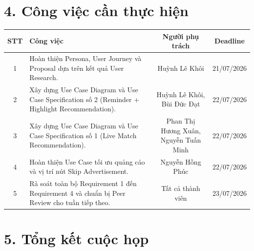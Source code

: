 \documentclass[11pt,a4paper]{article}
\begin{document}
\vspace{0.8cm}


\section*{4. Công việc cần thực hiện}

\begin{tabularx}{\textwidth}{|c|X|c|c|}
\hline
\rowcolor{gray!20}
\textbf{STT} &
\textbf{Công việc} &
\textbf{Người phụ trách} &
\textbf{Deadline}\\
\hline

1 &
Hoàn thiện Persona, User Journey và Proposal dựa trên kết quả User Research. &
Huỳnh Lê Khôi &
21/07/2026\\
\hline

2 &
Xây dựng Use Case Diagram và Use Case Specification số 2 (Reminder + Highlight Recommendation). &
Huỳnh Lê Khôi, Bùi Đức Đạt &
22/07/2026\\
\hline

3 &
Xây dựng Use Case Diagram và Use Case Specification số 1 (Live Match Recommendation). &
Phan Thị Hương Xuân, Nguyễn Tuấn Minh &
22/07/2026\\
\hline

4 &
Hoàn thiện Use Case tối ưu quảng cáo và vị trí nút Skip Advertisement. &
Nguyễn Hồng Phúc &
22/07/2026\\
\hline

5 &
Rà soát toàn bộ Requirement 1 đến Requirement 4 và chuẩn bị Peer Review cho tuần tiếp theo. &
Tất cả thành viên &
23/07/2026\\
\hline

\end{tabularx}

\vspace{0.8cm}


\section*{5. Tổng kết cuộc họp}
\end{document}
